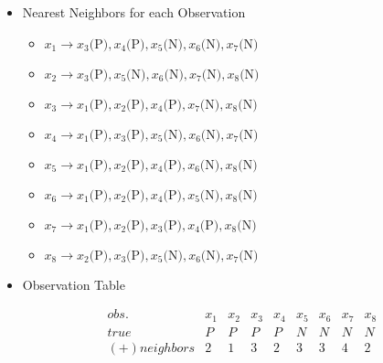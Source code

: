 \documentclass[12pt]{article}
\begin{document}
\begin{enumerate}[leftmargin=\labelsep, label=\textbf{\arabic*.)}]
\begin{itemize}
                    \vspace{0.5em}
              \item Nearest Neighbors for each Observation
                    \vspace{0.5em}
                    \begin{itemize}
                        \item \( x_1 \rightarrow x_3\text{(P)}, x_4\text{(P)}, x_5\text{(N)}, x_6\text{(N)}, x_7\text{(N)} \)
                        \item \( x_2 \rightarrow x_3\text{(P)}, x_5\text{(N)}, x_6\text{(N)}, x_7\text{(N)}, x_8\text{(N)} \)
                        \item \( x_3 \rightarrow x_1\text{(P)}, x_2\text{(P)}, x_4\text{(P)}, x_7\text{(N)}, x_8\text{(N)} \)
                        \item \( x_4 \rightarrow x_1\text{(P)}, x_3\text{(P)}, x_5\text{(N)}, x_6\text{(N)}, x_7\text{(N)} \)
                        \item \( x_5 \rightarrow x_1\text{(P)}, x_2\text{(P)}, x_4\text{(P)}, x_6\text{(N)}, x_8\text{(N)} \)
                        \item \( x_6 \rightarrow x_1\text{(P)}, x_2\text{(P)}, x_4\text{(P)}, x_5\text{(N)}, x_8\text{(N)} \)
                        \item \( x_7 \rightarrow x_1\text{(P)}, x_2\text{(P)}, x_3\text{(P)}, x_4\text{(P)}, x_8\text{(N)} \)
                        \item \( x_8 \rightarrow x_2\text{(P)}, x_3\text{(P)}, x_5\text{(N)}, x_6\text{(N)}, x_7\text{(N)} \)
                    \end{itemize}
                    \vspace{0.5em}
              \item Observation Table \\
                    \vspace{0.5em}
                    \begin{minipage}{1\textwidth}
                        \[
                            \begin{array}{|c|c|c|c|c|c|c|c|c|}
                                \hline
                                obs.          & x_1 & x_2 & x_3 & x_4 & x_5 & x_6 & x_7 & x_8 \\
                                \hline
                                true          & P   & P   & P   & P   & N   & N   & N   & N   \\
                                (+) neighbors & 2   & 1   & 3   & 2   & 3   & 3   & 4   & 2   \\

\end{array}\]
\end{minipage}
\end{itemize}
\end{enumerate}
\end{document}
